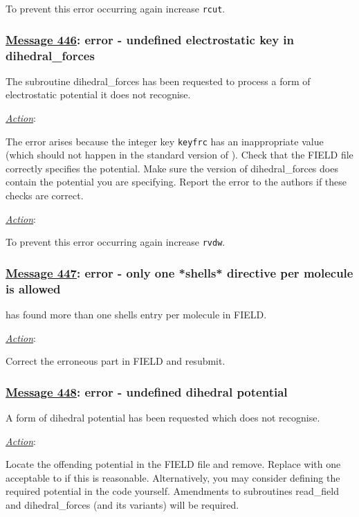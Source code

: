 To prevent this error occurring again increase {\tt rcut}.

\subsubsection*{\underline{Message 446}: error - undefined electrostatic key in
dihedral\_forces}

The subroutine {\sc dihedral\_forces} has been requested to process
a form of electrostatic potential it
does not recognise.

\noindent \underline{\em Action}:

The error arises because the integer key {\tt keyfrc} has an
inappropriate value (which should not happen in the standard
version of \D).  Check that the FIELD file correctly specifies the
potential.  Make sure the version of {\sc dihedral\_forces} does
contain the potential you are specifying.  Report the error to the
authors if these checks are correct.

\noindent \underline{\em Action}:

To prevent this error occurring again increase {\tt rvdw}.

\subsubsection*{\underline{Message 447}: error - only one *shells* directive per molecule is allowed}

\D has found more than one shells entry per molecule in FIELD.

\noindent \underline{\em Action}:

Correct the erroneous part in FIELD and resubmit.

\subsubsection*{\underline{Message 448}: error - undefined dihedral potential}

A form of dihedral potential has been
requested which \D does not recognise.

\noindent \underline{\em Action}:

Locate the offending potential in the FIELD file and remove.
Replace with one acceptable to \D if this is reasonable.
Alternatively, you may consider defining the required potential in
the code yourself.  Amendments to subroutines {\sc read\_field}
and {\sc dihedral\_forces} (and its variants) will be required.

